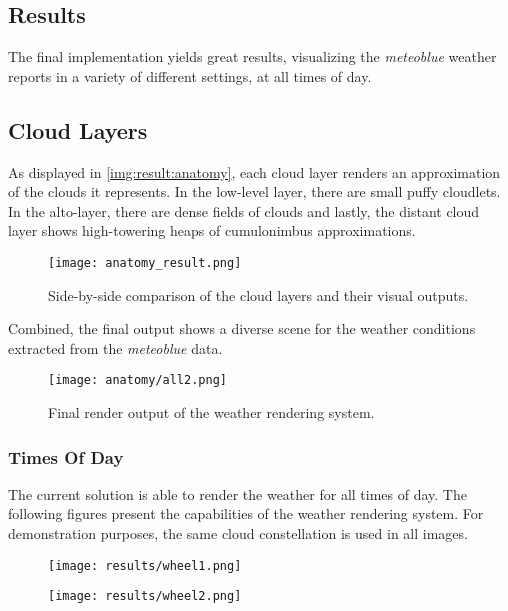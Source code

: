 \clearpage

\subsection{Results}
\label{section:techimpl:results}
The final implementation yields great results, visualizing the \emph{meteoblue} weather reports in a variety of different settings, at all times of day.

\subsection{Cloud Layers}
As displayed in \autoref{img:result:anatomy}, each cloud layer renders an approximation of the clouds it represents.
In the low-level layer, there are small puffy \gls{cloudlet}s. In the alto-layer, there are dense fields of clouds and lastly, the distant cloud layer shows high-towering heaps of cumulonimbus approximations.

\begin{figure}[H]
    \texttt{[image: anatomy\_result.png]}
    \caption{Side-by-side comparison of the cloud layers and their visual outputs.}
    \label{img:result:anatomy}
\end{figure}

\noindent
Combined, the final output shows a diverse scene for the weather conditions extracted from the \emph{meteoblue} data.

\begin{figure}[H]
    \texttt{[image: anatomy/all2.png]}
    \caption{Final render output of the weather rendering system.}
    \label{img:result:final1}
\end{figure}

\clearpage

\subsubsection{Times Of Day}
The current solution is able to render the weather for all times of day. The following figures present the capabilities of the weather rendering system. For demonstration purposes, the same cloud constellation is used in all images.

\begin{figure}[H]
    \centering
        \begin{minipage}{0.47\linewidth}
            \texttt{[image: results/wheel1.png]}
            \label{img:result:1}
        \end{minipage}
    \hfill
        \begin{minipage}{0.47\linewidth}
            \texttt{[image: results/wheel2.png]}
            \label{img:result:2}
        \end{minipage}
\end{figure}


